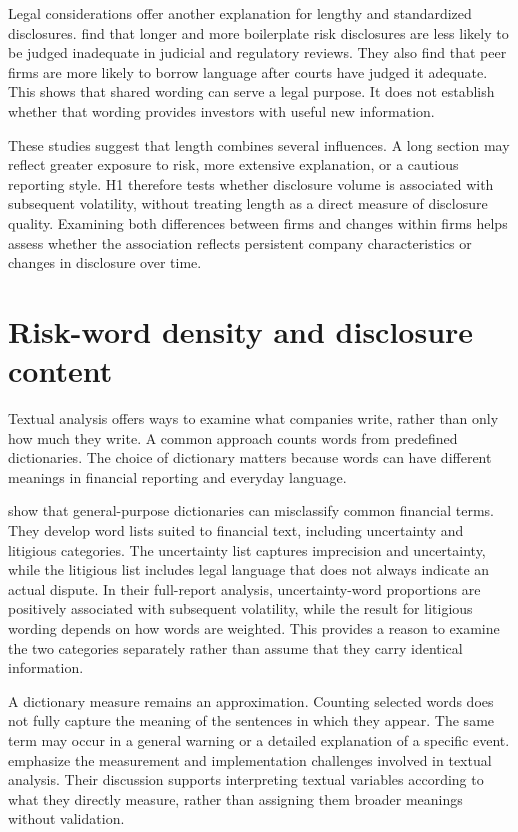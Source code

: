 Legal considerations offer another explanation for lengthy and standardized
disclosures. \textcite{cazier2021} find that longer and more boilerplate risk
disclosures are less likely to be judged inadequate in judicial and regulatory
reviews. They also find that peer firms are more likely to borrow language
after courts have judged it adequate. This shows that shared wording can serve
a legal purpose. It does not establish whether that wording provides investors
with useful new information.

These studies suggest that length combines several influences. A long section
may reflect greater exposure to risk, more extensive explanation, or a cautious
reporting style. H1 therefore tests whether disclosure volume is associated
with subsequent volatility, without treating length as a direct measure of
disclosure quality. Examining both differences between firms and changes
within firms helps assess whether the association reflects persistent company
characteristics or changes in disclosure over time.

\section{Risk-word density and disclosure content}

Textual analysis offers ways to examine what companies write, rather than only
how much they write. A common approach counts words from predefined
dictionaries. The choice of dictionary matters because words can have
different meanings in financial reporting and everyday language.

\textcite{loughran2011} show that general-purpose dictionaries can misclassify
common financial terms. They develop word lists suited to financial text,
including uncertainty and litigious categories. The uncertainty list captures
imprecision and uncertainty, while the litigious list includes legal language
that does not always indicate an actual dispute. In their full-report analysis,
uncertainty-word proportions are positively associated with subsequent
volatility, while the result for litigious wording depends on how words are
weighted. This provides a reason to examine the two categories separately
rather than assume that they carry identical information.

A dictionary measure remains an approximation. Counting selected words does
not fully capture the meaning of the sentences in which they appear. The same
term may occur in a general warning or a detailed explanation of a specific
event. \textcite{loughran2016} emphasize the measurement and implementation
challenges involved in textual analysis. Their discussion supports
interpreting textual variables according to what they directly measure, rather
than assigning them broader meanings without validation.

